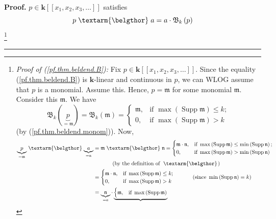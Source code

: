 \documentclass[numbers=enddot,12pt,final,onecolumn,notitlepage,abstracton]{scrartcl}%
\theoremstyle{definition}
\newenvironment{proof}[1][Proof]{\noindent\textbf{#1.} }{\ \rule{0.5em}{0.5em}}
\newenvironment{verlong}{}{}
\newcommand{\bel}{\left. \textarm{\belgthor} \right.}
\begin{document}
\begin{proof}
\begin{verlong}
$p\in\mathbf{k}\left[  \left[  x_{1},x_{2},x_{3},\ldots\right]  \right]  $
satisfies%
\begin{equation}
p\bel a=a\cdot\mathfrak{B}_{k}\left(  p\right)  \label{pf.thm.beldend.B}%
\end{equation}
\footnote{\textit{Proof of (\ref{pf.thm.beldend.B}):} Fix $p\in\mathbf{k}%
\left[  \left[  x_{1},x_{2},x_{3},\ldots\right]  \right]  $. Since the
equality (\ref{pf.thm.beldend.B}) is $\mathbf{k}$-linear and continuous in
$p$, we can WLOG assume that $p$ is a monomial. Assume this. Hence,
$p=\mathfrak{m}$ for some monomial $\mathfrak{m}$. Consider this
$\mathfrak{m}$. We have%
\begin{equation}
\mathfrak{B}_{k}\left(  \underbrace{p}_{=\mathfrak{m}}\right)  =\mathfrak{B}%
_{k}\left(  \mathfrak{m}\right)  =%
\begin{cases}
\mathfrak{m}, & \text{if }\max\left(  \operatorname*{Supp}\mathfrak{m}\right)
\leq k;\\
0, & \text{if }\max\left(  \operatorname*{Supp}\mathfrak{m}\right)  >k
\end{cases}
\label{pf.thm.beldend.B.pf.2}%
\end{equation}
(by (\ref{pf.thm.beldend.monom})). Now,%
\begin{align*}
\underbrace{p}_{=\mathfrak{m}}\bel\underbrace{a}_{=\mathfrak{n}}  &
=\mathfrak{m}\bel\mathfrak{n}=%
\begin{cases}
\mathfrak{m}\cdot\mathfrak{n}, & \text{if }\max\left(  \operatorname*{Supp}%
\mathfrak{m}\right)  \leq\min\left(  \operatorname*{Supp}\mathfrak{n}\right)
;\\
0, & \text{if }\max\left(  \operatorname*{Supp}\mathfrak{m}\right)
>\min\left(  \operatorname*{Supp}\mathfrak{n}\right)
\end{cases}
\\
&  \ \ \ \ \ \ \ \ \ \ \left(  \text{by the definition of }\bel\right) \\
&  =%
\begin{cases}
\mathfrak{m}\cdot\mathfrak{n}, & \text{if }\max\left(  \operatorname*{Supp}%
\mathfrak{m}\right)  \leq k;\\
0, & \text{if }\max\left(  \operatorname*{Supp}\mathfrak{m}\right)  >k
\end{cases}
\ \ \ \ \ \ \ \ \ \ \left(  \text{since }\min\left(  \operatorname*{Supp}%
\mathfrak{n}\right)  =k\right) \\
&  =\underbrace{\mathfrak{n}}_{=a}\cdot\underbrace{%
\begin{cases}
\mathfrak{m}, & \text{if }\max\left(  \operatorname*{Supp}\mathfrak{m}\right)

\end{cases}}
\end{align*}}
\end{verlong}
\end{proof}
\end{document}

